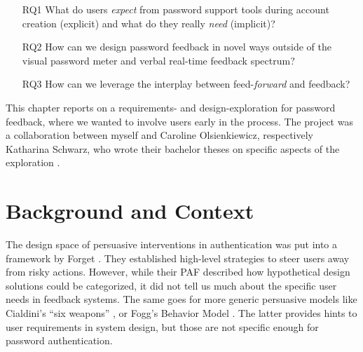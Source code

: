 \begin{itemize}
	\item[RQ1] What do users \textit{expect} from password support tools during account creation (explicit) and what do they really \textit{need} (implicit)?
	\item[RQ2] How can we design password feedback in novel ways outside of the visual password meter and verbal real-time feedback spectrum? %
	\item[RQ3] How can we leverage the interplay between feed-\textit{forward} and feedback?
\end{itemize}


This chapter reports on a requirements- and design-exploration for password feedback, where we wanted to involve users early in the process. The project was a collaboration between myself and Caroline Olsienkiewicz, respectively Katharina Schwarz, who wrote their bachelor theses on specific aspects of the exploration \cite{Olsienkiewicz2016BAThesis, Schwarz2016BAThesis}.

\section{Background and Context}

The design space of persuasive interventions in authentication was put into a framework by Forget \etal \cite{Forget2007PersuasionEducationSecurity}. They established high-level strategies to steer users away from risky actions. However, while their \acrlong{PAF} described how hypothetical design solutions could be categorized, it did not tell us much about the specific user needs in feedback systems. The same goes for more generic persuasive models like Cialdini's ``six weapons'' \cite{Cialdini2007Influence}, or Fogg's Behavior Model \cite{Fogg2009BehavioralModel}. The latter provides hints to user requirements in system design, but those are not specific enough for password authentication.

